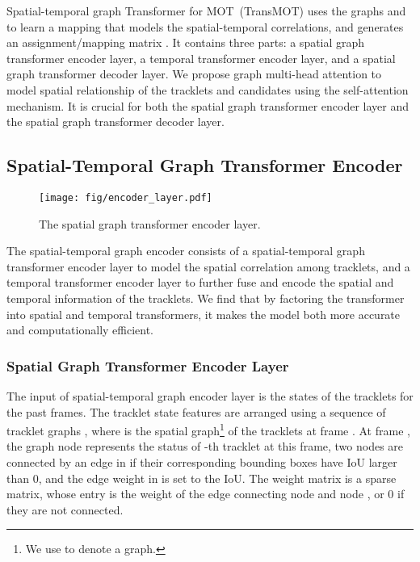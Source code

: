 \documentclass[10pt,twocolumn,letterpaper]{article}
\begin{document}
Spatial-temporal graph Transformer for MOT~(TransMOT) uses the graphs  and   to learn a mapping   that models the spatial-temporal correlations, and generates an assignment/mapping matrix . It contains three parts: a spatial graph transformer encoder layer, a temporal transformer encoder layer, and a spatial graph transformer decoder layer. We propose graph multi-head attention to model spatial relationship of the tracklets and candidates using the self-attention mechanism. It is crucial for both the spatial graph transformer encoder layer and the spatial graph transformer decoder layer.





\subsection{Spatial-Temporal Graph Transformer Encoder}
\label{sec:encoder}

\begin{figure}
	\centering
	\texttt{[image: fig/encoder\_layer.pdf]}
	\caption{The spatial graph transformer encoder layer. }
	\label{fig:encoder}
\end{figure}

The spatial-temporal graph encoder consists of a spatial-temporal graph transformer encoder layer to model the spatial correlation among tracklets, and a temporal transformer encoder layer to further fuse and encode the spatial and temporal information of the tracklets. We find that by factoring the transformer into spatial and temporal transformers, it makes the model both more accurate and computationally efficient. 

\subsubsection{Spatial Graph Transformer Encoder Layer}
The input of spatial-temporal graph encoder layer is the states of the tracklets for the past  frames.  The tracklet state features are arranged using a sequence of tracklet graphs  , where  is the spatial graph\footnote{We use  to denote a graph.} of the tracklets at frame . 
At frame , the graph node  represents the status of -th tracklet at this frame, two nodes are connected by an edge in  if their corresponding bounding boxes have IoU larger than 0, and the edge weight in  is set to the IoU. The weight matrix  is a sparse matrix, whose  entry is the weight of the edge connecting node  and node , or 0 if they are not connected. 
\end{document}
